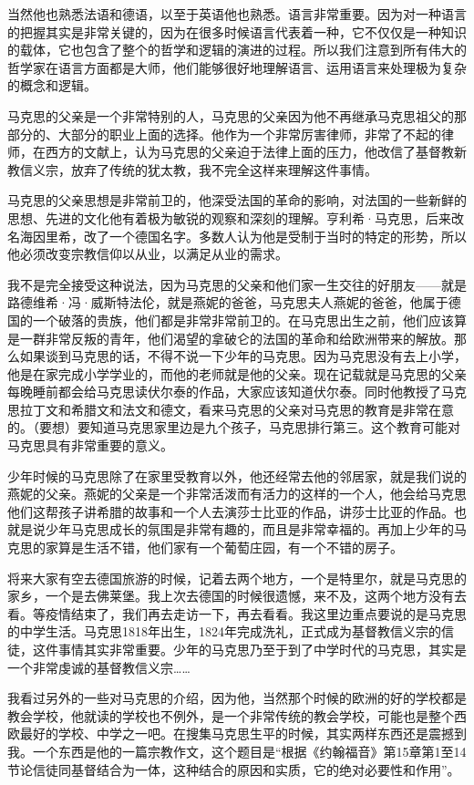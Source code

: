 \documentclass[UTF8, 12pt, a4paper]{ctexrep}
\begin{document}
当然他也熟悉法语和德语，以至于英语他也熟悉。语言非常重要。因为对一种语言的把握其实是非常关键的，因为在很多时候语言代表着一种，它不仅仅是一种知识的载体，它也包含了整个的哲学和逻辑的演进的过程。所以我们注意到所有伟大的哲学家在语言方面都是大师，他们能够很好地理解语言、运用语言来处理极为复杂的概念和逻辑。

马克思的父亲是一个非常特别的人，马克思的父亲因为他不再继承马克思祖父的那部分的、大部分的职业上面的选择。他作为一个非常厉害律师，非常了不起的律师，在西方的文献上，认为马克思的父亲迫于法律上面的压力，他改信了基督教新教信义宗，放弃了传统的犹太教，我不完全这样来理解这件事情。

马克思的父亲思想是非常前卫的，他深受法国的革命的影响，对法国的一些新鲜的思想、先进的文化他有着极为敏锐的观察和深刻的理解。亨利希·马克思，后来改名海因里希，改了一个德国名字。多数人认为他是受制于当时的特定的形势，所以他必须改变宗教信仰以从业，以满足从业的需求。

我不是完全接受这种说法，因为马克思的父亲和他们家一生交往的好朋友——就是路德维希·冯·威斯特法伦，就是燕妮的爸爸，马克思夫人燕妮的爸爸，他属于德国的一个破落的贵族，他们都是非常非常前卫的。在马克思出生之前，他们应该算是一群非常反叛的青年，他们渴望的拿破仑的法国的革命和给欧洲带来的解放。那么如果谈到马克思的话，不得不说一下少年的马克思。因为马克思没有去上小学，他是在家完成小学学业的，而他的老师就是他的父亲。现在记载就是马克思的父亲每晚睡前都会给马克思读伏尔泰的作品，大家应该知道伏尔泰。同时他教授了马克思拉丁文和希腊文和法文和德文，看来马克思的父亲对马克思的教育是非常在意的。（要想）要知道马克思家里边是九个孩子，马克思排行第三。这个教育可能对马克思具有非常重要的意义。

少年时候的马克思除了在家里受教育以外，他还经常去他的邻居家，就是我们说的燕妮的父亲。燕妮的父亲是一个非常活泼而有活力的这样的一个人，他会给马克思他们这帮孩子讲希腊的故事和一个人去演莎士比亚的作品，讲莎士比亚的作品。也就是说少年马克思成长的氛围是非常有趣的，而且是非常幸福的。再加上少年的马克思的家算是生活不错，他们家有一个葡萄庄园，有一个不错的房子。

将来大家有空去德国旅游的时候，记着去两个地方，一个是特里尔，就是马克思的家乡，一个是去佛莱堡。我上次去德国的时候很遗憾，来不及，这两个地方没有去看。等疫情结束了，我们再去走访一下，再去看看。我这里边重点要说的是马克思的中学生活。马克思1818年出生，1824年完成洗礼，正式成为基督教信义宗的信徒，这件事情其实非常重要。少年的马克思乃至于到了中学时代的马克思，其实是一个非常虔诚的基督教信义宗……

我看过另外的一些对马克思的介绍，因为他，当然那个时候的欧洲的好的学校都是教会学校，他就读的学校也不例外，是一个非常传统的教会学校，可能也是整个西欧最好的学校、中学之一吧。在搜集马克思生平的时候，其实两样东西还是震撼到我。一个东西是他的一篇宗教作文，这个题目是“根据《约翰福音》第15章第1至14节论信徒同基督结合为一体，这种结合的原因和实质，它的绝对必要性和作用”。
\end{document}
